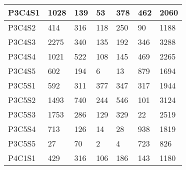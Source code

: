 \begin{longtable}{lllllll}
\multicolumn{1}{|l|}{P3C4S1} & \multicolumn{1}{l|}{1028} & \multicolumn{1}{l|}{139} & \multicolumn{1}{l|}{53} & \multicolumn{1}{l|}{378} & \multicolumn{1}{l|}{462} & \multicolumn{1}{l|}{2060} \\ \hline
\multicolumn{1}{|l|}{P3C4S2} & \multicolumn{1}{l|}{414} & \multicolumn{1}{l|}{316} & \multicolumn{1}{l|}{118} & \multicolumn{1}{l|}{250} & \multicolumn{1}{l|}{90} & \multicolumn{1}{l|}{1188} \\ \hline
\multicolumn{1}{|l|}{P3C4S3} & \multicolumn{1}{l|}{2275} & \multicolumn{1}{l|}{340} & \multicolumn{1}{l|}{135} & \multicolumn{1}{l|}{192} & \multicolumn{1}{l|}{346} & \multicolumn{1}{l|}{3288} \\ \hline
\multicolumn{1}{|l|}{P3C4S4} & \multicolumn{1}{l|}{1021} & \multicolumn{1}{l|}{522} & \multicolumn{1}{l|}{108} & \multicolumn{1}{l|}{145} & \multicolumn{1}{l|}{469} & \multicolumn{1}{l|}{2265} \\ \hline
\multicolumn{1}{|l|}{P3C4S5} & \multicolumn{1}{l|}{602} & \multicolumn{1}{l|}{194} & \multicolumn{1}{l|}{6} & \multicolumn{1}{l|}{13} & \multicolumn{1}{l|}{879} & \multicolumn{1}{l|}{1694} \\ \hline
\multicolumn{1}{|l|}{P3C5S1} & \multicolumn{1}{l|}{592} & \multicolumn{1}{l|}{311} & \multicolumn{1}{l|}{377} & \multicolumn{1}{l|}{347} & \multicolumn{1}{l|}{317} & \multicolumn{1}{l|}{1944} \\ \hline
\multicolumn{1}{|l|}{P3C5S2} & \multicolumn{1}{l|}{1493} & \multicolumn{1}{l|}{740} & \multicolumn{1}{l|}{244} & \multicolumn{1}{l|}{546} & \multicolumn{1}{l|}{101} & \multicolumn{1}{l|}{3124} \\ \hline
\multicolumn{1}{|l|}{P3C5S3} & \multicolumn{1}{l|}{1753} & \multicolumn{1}{l|}{286} & \multicolumn{1}{l|}{129} & \multicolumn{1}{l|}{329} & \multicolumn{1}{l|}{22} & \multicolumn{1}{l|}{2519} \\ \hline
\multicolumn{1}{|l|}{P3C5S4} & \multicolumn{1}{l|}{713} & \multicolumn{1}{l|}{126} & \multicolumn{1}{l|}{14} & \multicolumn{1}{l|}{28} & \multicolumn{1}{l|}{938} & \multicolumn{1}{l|}{1819} \\ \hline
\multicolumn{1}{|l|}{P3C5S5} & \multicolumn{1}{l|}{27} & \multicolumn{1}{l|}{70} & \multicolumn{1}{l|}{2} & \multicolumn{1}{l|}{4} & \multicolumn{1}{l|}{723} & \multicolumn{1}{l|}{826} \\ \hline
\multicolumn{1}{|l|}{P4C1S1} & \multicolumn{1}{l|}{429} & \multicolumn{1}{l|}{316} & \multicolumn{1}{l|}{106} & \multicolumn{1}{l|}{186} & \multicolumn{1}{l|}{143} & \multicolumn{1}{l|}{1180} \\ \hline

\end{longtable}
